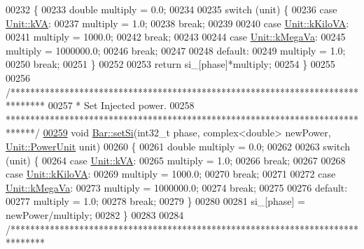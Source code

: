 \begin{DoxyCode}
00232 \{
00233   \textcolor{keywordtype}{double} multiply = 0.0;
00234 
00235   \textcolor{keywordflow}{switch} (unit) \{
00236   \textcolor{keywordflow}{case} \hyperlink{class_unit_ace265ae255370ccacfd5370337572c3ba72b181a842ae2759488a2fa1410d3696}{Unit::kVA}:
00237     multiply = 1.0;
00238     \textcolor{keywordflow}{break};
00239 
00240   \textcolor{keywordflow}{case} \hyperlink{class_unit_ace265ae255370ccacfd5370337572c3bac9e5154522fbb810d7aed75c3ff47cb2}{Unit::kKiloVA}:
00241     multiply = 1000.0;
00242     \textcolor{keywordflow}{break};
00243 
00244   \textcolor{keywordflow}{case} \hyperlink{class_unit_ace265ae255370ccacfd5370337572c3ba6039da0ed20f8bee64305bab8bdec365}{Unit::kMegaVa}:
00245     multiply = 1000000.0;
00246     \textcolor{keywordflow}{break};
00247 
00248   \textcolor{keywordflow}{default}:
00249     multiply = 1.0;
00250     \textcolor{keywordflow}{break};
00251   \}
00252 
00253   \textcolor{keywordflow}{return} si\_[phase]*multiply;
00254 \}
00255 
00256 \textcolor{comment}{/*******************************************************************************}
00257 \textcolor{comment}{ * Set Injected power.}
00258 \textcolor{comment}{ ******************************************************************************/}
\hypertarget{bar_8cpp_source_l00259}{}\hyperlink{group___models_ga74e510be49e50e4c14550b32e1dc92f9}{00259} \textcolor{keywordtype}{void} \hyperlink{group___models_ga74e510be49e50e4c14550b32e1dc92f9}{Bar::setSi}(int32\_t phase, complex<double> newPower, 
      \hyperlink{class_unit_ace265ae255370ccacfd5370337572c3b}{Unit::PowerUnit} unit)
00260 \{
00261   \textcolor{keywordtype}{double} multiply = 0.0;
00262 
00263   \textcolor{keywordflow}{switch} (unit) \{
00264   \textcolor{keywordflow}{case} \hyperlink{class_unit_ace265ae255370ccacfd5370337572c3ba72b181a842ae2759488a2fa1410d3696}{Unit::kVA}:
00265     multiply = 1.0;
00266     \textcolor{keywordflow}{break};
00267 
00268   \textcolor{keywordflow}{case} \hyperlink{class_unit_ace265ae255370ccacfd5370337572c3bac9e5154522fbb810d7aed75c3ff47cb2}{Unit::kKiloVA}:
00269     multiply = 1000.0;
00270     \textcolor{keywordflow}{break};
00271 
00272   \textcolor{keywordflow}{case} \hyperlink{class_unit_ace265ae255370ccacfd5370337572c3ba6039da0ed20f8bee64305bab8bdec365}{Unit::kMegaVa}:
00273     multiply = 1000000.0;
00274     \textcolor{keywordflow}{break};
00275 
00276   \textcolor{keywordflow}{default}:
00277     multiply = 1.0;
00278     \textcolor{keywordflow}{break};
00279   \}
00280 
00281   si\_[phase] = newPower/multiply;
00282 \}
00283 
00284 \textcolor{comment}{/*******************************************************************************}

\end{DoxyCode}
